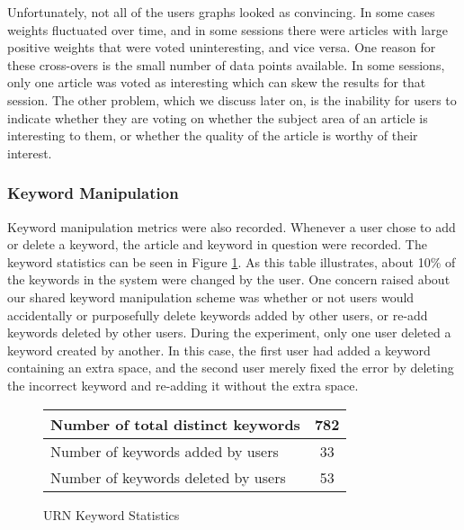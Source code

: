 Unfortunately, not all of the users graphs looked as convincing. In some cases
weights fluctuated over time, and in some sessions there were articles with
large positive weights that were voted uninteresting, and vice versa. One
reason for these cross-overs is the small number of data points available. In
some sessions, only one article was voted as interesting which can skew the
results for that session. The other problem, which we discuss later on, is the
inability for users to indicate whether they are voting on whether the subject
area of an article is interesting to them, or whether the quality of the
article is worthy of their interest.

\subsubsection{Keyword Manipulation}

Keyword manipulation metrics were also recorded. Whenever a user chose to
add or delete a keyword, the article and keyword in question were recorded.
The keyword statistics can be seen in Figure \ref{tab:keyword-stat}. As
this table illustrates, about 10\% of the keywords in the system were
changed by the user. One concern raised about our shared keyword
manipulation scheme was whether or not users would accidentally or
purposefully delete keywords added by other users, or re-add keywords
deleted by other users. During the experiment, only one user deleted a
keyword created by another. In this case, the first user had added a
keyword containing an extra space, and the second user merely fixed the
error by deleting the incorrect keyword and re-adding it without the extra
space.


\begin{figure}[htb]
  \begin{center}
    \small
  \begin{tabular} {|l|c|} \hline   
    Number of total distinct keywords & 782 \\ \hline
    Number of keywords added by users & 33 \\ \hline
    Number of keywords deleted by users & 53 \\ \hline
  \end{tabular}
  \caption{URN Keyword Statistics}
  \label{tab:keyword-stat}
  \normalsize
  \end{center}
\end{figure}


